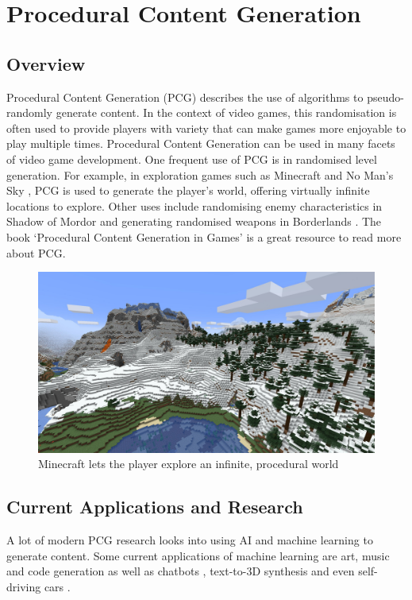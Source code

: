 \section{Procedural Content Generation}
\subsection{Overview}
Procedural Content Generation (PCG) describes the use of algorithms to pseudo-randomly generate content. In the context of video games, this randomisation is often used to provide players with variety that can make games more enjoyable to play multiple times. Procedural Content Generation can be used in many facets of video game development. One frequent use of PCG is in randomised level generation. For example, in exploration games such as Minecraft \cite{minecraft} and No Man's Sky \cite{nomanssky}, PCG is used to generate the player's world, offering virtually infinite locations to explore. Other uses include randomising enemy characteristics in Shadow of Mordor \cite{shadowofmordor} and generating randomised weapons in Borderlands \cite{borderlands}. The book `Procedural Content Generation in Games' \cite{pcgbook} is a great resource to read more about PCG.

\begin{figure}[H]
    \centering
    \includegraphics[width=\textwidth, height=0.3\textheight, keepaspectratio]{Images/Minecraft.jpg}
    \caption{Minecraft lets the player explore an infinite, procedural world \cite{minecraft_screenshot}}
    \label{fig:minecraftScreenshot}
\end{figure}

\subsection{Current Applications and Research}
A lot of modern PCG research looks into using AI and machine learning to generate content. Some current applications of machine learning are art, music and code generation as well as chatbots \cite{AIGC_Survey}, text-to-3D synthesis \cite{Magic3D} and even self-driving cars \cite{Self_Driving_Cars}.

